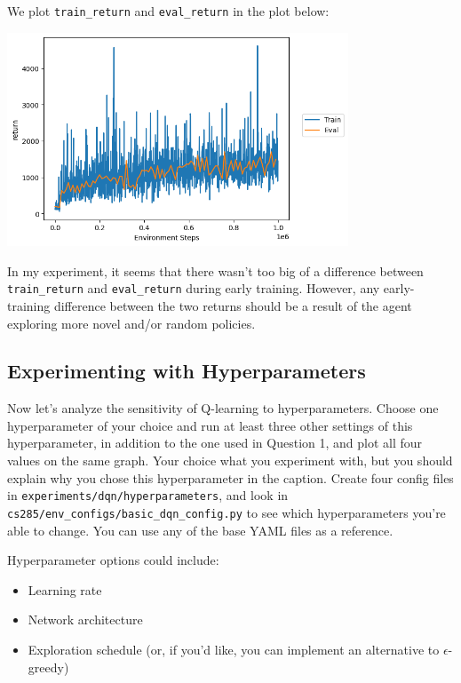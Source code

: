 \begin{itemize}
    \begin{sol}
        We plot \texttt{train\_return} and \texttt{eval\_return} in the plot below:
        \begin{center}
            \includegraphics[width=4in]{../q2.5_pacman.png}
        \end{center}
        In my experiment, it seems that there wasn't too big of a difference between \texttt{train\_return} and \texttt{eval\_return} during early training. However, any early-training difference between the two returns should be a result of the agent exploring more novel and/or random policies.
    \end{sol}
\end{itemize}

\subsection{Experimenting with Hyperparameters} Now let's analyze the sensitivity of Q-learning to hyperparameters. Choose one hyperparameter of your choice and run at least three other settings of this hyperparameter, in addition to the one used in Question 1, and plot all four values on the same graph. Your choice what you experiment with, but you should explain why you chose this hyperparameter in the caption. Create four config files in \verb|experiments/dqn/hyperparameters|, and look in \verb|cs285/env_configs/basic_dqn_config.py| to see which hyperparameters you're able to change. You can use any of the base YAML files as a reference.

Hyperparameter options could include:
\begin{itemize}
    \item Learning rate
    \item Network architecture
    \item Exploration schedule (or, if you'd like, you can implement an alternative to $\epsilon$-greedy)
\end{itemize}

